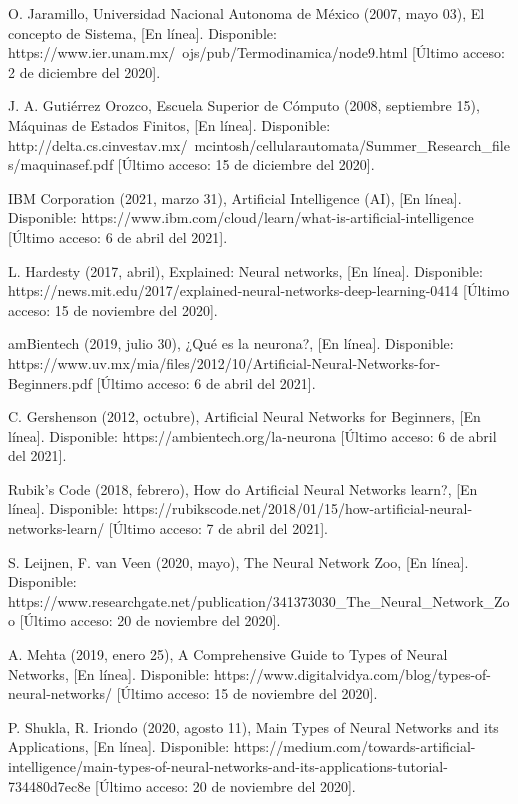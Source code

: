 \documentclass[12pt, a4paper, titlepage]{report}
\begin{document}
\begin{thebibliography}{20}
	O. Jaramillo, Universidad Nacional Autonoma de México (2007, mayo 03), El concepto de Sistema, [En línea]. Disponible: https://www.ier.unam.mx/~ojs/pub/Termodinamica/node9.html [Último acceso: 2 de diciembre del 2020].
	
	J. A. Gutiérrez Orozco, Escuela Superior de Cómputo (2008, septiembre 15), Máquinas de Estados Finitos, [En línea]. Disponible: http://delta.cs.cinvestav.mx/~mcintosh/cellularautomata/Summer\_Research\_files/maquinasef.pdf [Último acceso: 15 de diciembre del 2020].
	
	IBM Corporation (2021, marzo 31), Artificial Intelligence (AI), [En línea]. Disponible: https://www.ibm.com/cloud/learn/what-is-artificial-intelligence [Último acceso: 6 de abril del 2021].
	
	L. Hardesty  (2017, abril), Explained: Neural networks, [En línea]. Disponible: https://news.mit.edu/2017/explained-neural-networks-deep-learning-0414 [Último acceso: 15 de noviembre del 2020].
	
		
	amBientech (2019, julio 30), ¿Qué es la neurona?, [En línea]. Disponible: https://www.uv.mx/mia/files/2012/10/Artificial-Neural-Networks-for-Beginners.pdf [Último acceso: 6 de abril del 2021].
	
	C. Gershenson (2012, octubre), Artificial Neural Networks for Beginners, [En línea]. Disponible: https://ambientech.org/la-neurona [Último acceso: 6 de abril del 2021].
	
	Rubik's Code  (2018, febrero), How do Artificial Neural Networks learn?, [En línea]. Disponible: https://rubikscode.net/2018/01/15/how-artificial-neural-networks-learn/ [Último acceso: 7 de abril del 2021].	
	
	S. Leijnen, F. van Veen (2020, mayo), The Neural Network Zoo, [En línea]. Disponible: https://www.researchgate.net/publication/341373030\_The\_Neural\_Network\_Zoo [Último acceso: 20 de noviembre del 2020].
	
	A. Mehta (2019, enero 25), A Comprehensive Guide to Types of Neural Networks, [En línea]. Disponible: https://www.digitalvidya.com/blog/types-of-neural-networks/ [Último acceso: 15 de noviembre del 2020].
	
	P. Shukla, R. Iriondo (2020, agosto 11), Main Types of Neural Networks and its Applications, [En línea]. Disponible: https://medium.com/towards-artificial-intelligence/main-types-of-neural-networks-and-its-applications-tutorial-734480d7ec8e [Último acceso: 20 de noviembre del 2020].
	

\end{thebibliography}
\end{document}
